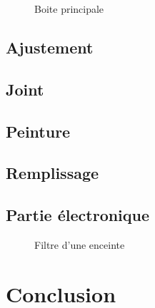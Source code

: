 \documentclass[a4paper,english]{report}
\begin{document}
				\begin{figure}[H]
					\centering
					\label{Boite principlae}
					\caption{Boite principale}
				\end{figure}			
			 
			\section{Ajustement}

			\section{Joint}

			\section{Peinture}

			\section{Remplissage}

			\section{Partie électronique}

		
			\begin{figure}[H]
				\centering
				\label{Filtre d'une enceinte}
				\caption{Filtre d'une enceinte}
			\end{figure}			
		\chapter{Conclusion}


		
			
			
		
\end{document}
